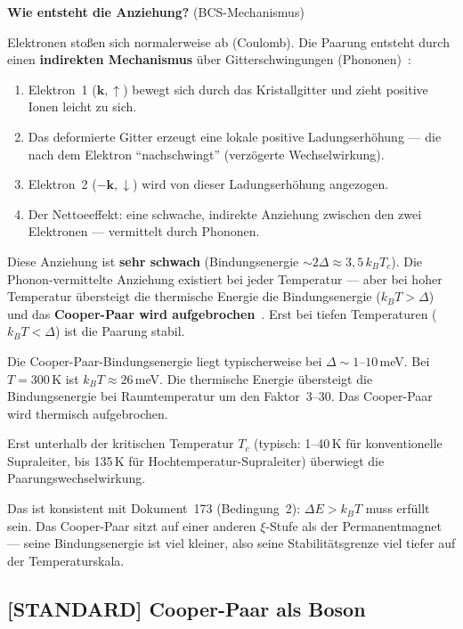 \textbf{Wie entsteht die Anziehung?} (BCS-Mechanismus)

Elektronen stoßen sich normalerweise ab (Coulomb).
Die Paarung entsteht durch einen \textbf{indirekten Mechanismus}
über Gitterschwingungen (Phononen)~\cite{BCS1957}:

\begin{enumerate}
  \item Elektron~1 ($\mathbf{k},\uparrow$) bewegt sich durch
    das Kristallgitter und zieht positive Ionen leicht zu sich.
  \item Das deformierte Gitter erzeugt eine lokale
    positive Ladungserhöhung --- die nach dem Elektron
    ``nachschwingt'' (verzögerte Wechselwirkung).
  \item Elektron~2 ($-\mathbf{k},\downarrow$) wird von
    dieser Ladungserhöhung angezogen.
  \item Der Nettoeeffekt: eine schwache, indirekte Anziehung
    zwischen den zwei Elektronen --- vermittelt durch Phononen.
\end{enumerate}

Diese Anziehung ist \textbf{sehr schwach} (Bindungsenergie
$\sim 2\Delta \approx 3{,}5\,k_BT_c$).
Die Phonon-vermittelte Anziehung existiert bei jeder Temperatur ---
aber bei hoher Temperatur übersteigt die thermische Energie
die Bindungsenergie ($k_BT > \Delta$) und das
\textbf{Cooper-Paar wird aufgebrochen}~\cite{BCS1957}.
Erst bei tiefen Temperaturen ($k_BT < \Delta$) ist
die Paarung stabil.

\begin{important}
Die Cooper-Paar-Bindungsenergie liegt typischerweise
bei $\Delta \sim 1$--$10$\,meV.
Bei $T = 300$\,K ist $k_BT \approx 26$\,meV.
Die thermische Energie übersteigt die Bindungsenergie
bei Raumtemperatur um den Faktor~3--30.
Das Cooper-Paar wird thermisch aufgebrochen.

Erst unterhalb der kritischen Temperatur $T_c$
(typisch: 1--40\,K für konventionelle Supraleiter,
bis 135\,K für Hochtemperatur-Supraleiter)
überwiegt die Paarungswechselwirkung.

Das ist konsistent mit Dokument~173 (Bedingung~2):
$\Delta E > k_BT$ muss erfüllt sein.
Das Cooper-Paar sitzt auf einer anderen $\xi$-Stufe
als der Permanentmagnet --- seine Bindungsenergie
ist viel kleiner, also seine Stabilitätsgrenze
viel tiefer auf der Temperaturskala.
\end{important}

\subsection{[STANDARD] Cooper-Paar als Boson}

